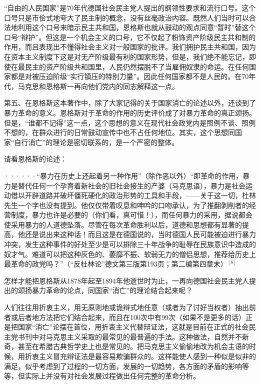 “自由的人民国家”是70年代德国社会民主党人提出的纲领性要求和流行口号。这个口号只是市侩式地夸大了民主制的概念，没有丝毫政治内容。既然人们当时可以合法地利用这个口号来暗示民主共和国，恩格斯也就从鼓动的观点同意“暂时”替这个口号“辩护”。但这是一个机会主义的口号，它不仅起了粉饰资产阶级民主共和制的作用，而且表现出不懂得社会主义对一般国家的批评。我们拥护民主共和国，因为在资本主义制度下这是对无产阶级最有利的国家形势，但是，我们绝不能忘记，即使在最民主的资产阶级共和国里，人民仍然摆脱不了当雇佣奴隶的命运。在任何国家都是对被压迫阶级“实行镇压的特别力量”。因此{\kaishu 任何}国家都{\kaishu 不是}人民的。在70年代，马克思和恩格斯一再向他们党内的同志解释这一点。

第五、在恩格斯这本著作中，除了大家记得的关于国家消亡的论述以外，还谈到了暴力革命的意义。恩格斯对于革命的作用的历史评价成了对暴力革命的真正颂扬。但是，“谁都不记得”这一点，这个思想的意义在现代社会政党内是照例不谈、照例不想的，在群众进行的日常鼓动宣传中也不占任何地位。其实，这个思想同国家“自行消亡”的理论是密切联系的，是一个严密的整体。

请看恩格斯的论述：
\pskip
\leftskip=10mm
\small

······“暴力在历史上还起着另一种作用”（除作恶以外）“即革命的作用，暴力是替代任何一个孕育着新社会的旧社会接生的产婆（马克思语），暴力是社会运动借以开辟道路并破坏僵死硬化的政治形势的工具和手段，——关于这一切，杜林先生一个字也没有提到。他仅仅带着叹息和呻吟的口吻承认，为了推翻剥削者的经营制度，暴力也许是必要的（你们看，真可惜！），而任何暴力的采用，据说都会使采用暴力的人道德坠落。尽管在每次革命胜利以后，道德和思想都有显著的提高，他还是说出来这种话！而且这是在德国说的，当时德国人民可能被迫进行暴力冲突，发生这种事件的好处至少是可以排除三十年战争的耻辱在民族意识中造成的奴才气。难道可以把这种灰色的、萎靡不振、软弱无力的僧侣思想，推荐给历史上最革命的政党吗？”（“反杜林论”德文第三版第193页；第二编第四章末）$^{[8]}$

\pskip
\leftskip=0mm
\normalsize

怎样才能把恩格斯从1878年起至1894年他逝世时为止，一再向德国社会民主党人提出的颂扬暴力革命的论点，同国家“消亡”的理论结合起来呢？

人们往往用折衷主义，用无原则地或诡辩式地任意（或者为了讨好当权者）抽出前者或后者地方法把它们结合起来，而且在100次中有99次（如果不是更多的话）正是把国家“消亡”论摆在首位，用折衷主义代替辩证法，这就是目前在正式的社会民主党书刊中对马克思主义采取的最常见的最普遍的手法。这种做法，自然并不新奇，甚至在希腊古典哲学史上也是常见的。把马克思主义偷偷地改为机会主语的时候，用折衷主义冒充辩证法是最容易欺骗群众的。这样能使人感到一种似是似非的满足，似乎考虑到了过程的一切方面，发展的一切趋势，各方面的矛盾的影响等等，但实际上并没有对社会发展过程做出任何完整的革命分析。

